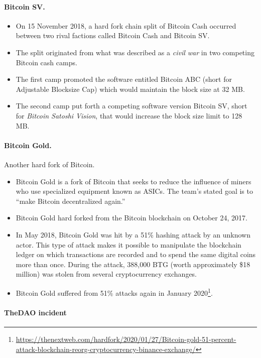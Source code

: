 \paragraph*{Bitcoin SV.}
\begin{itemize}
	\item On 15 November 2018, a hard fork chain split of Bitcoin Cash occurred between two rival factions called Bitcoin Cash and Bitcoin SV.
	\item The split originated from what was described as a \textit{civil war} in two competing Bitcoin cash camps.
	\item The first camp promoted the software entitled Bitcoin ABC (short for Adjustable Blocksize Cap) which would maintain the block size at 32 MB.
	\item The second camp put forth a competing software version Bitcoin SV, short for \emph{Bitcoin Satoshi Vision}, that would increase the block size limit to 128 MB.
\end{itemize}

\paragraph*{Bitcoin Gold.}
Another hard fork of Bitcoin.
\begin{itemize}
	\item Bitcoin Gold is a fork of Bitcoin that seeks to reduce the influence of miners who use specialized equipment known as ASICs. The team's stated goal is to ``make Bitcoin decentralized again.''
	\item Bitcoin Gold hard forked from the Bitcoin blockchain on October 24, 2017.
	\item In May 2018, Bitcoin Gold was hit by a 51\% hashing attack by an unknown actor. This type of attack makes it possible to manipulate the blockchain ledger on which transactions are recorded and to spend the same digital coins more than once. During the attack, 388,000 BTG (worth approximately \$18 million) was stolen from several cryptocurrency exchanges.
	\item Bitcoin Gold suffered from 51\% attacks again in January 2020\footnote{{\scriptsize\url{https://thenextweb.com/hardfork/2020/01/27/Bitcoin-gold-51-percent-attack-blockchain-reorg-cryptocurrency-binance-exchange/}}}.
\end{itemize}

\paragraph{TheDAO incident}\label{dao-incident}

